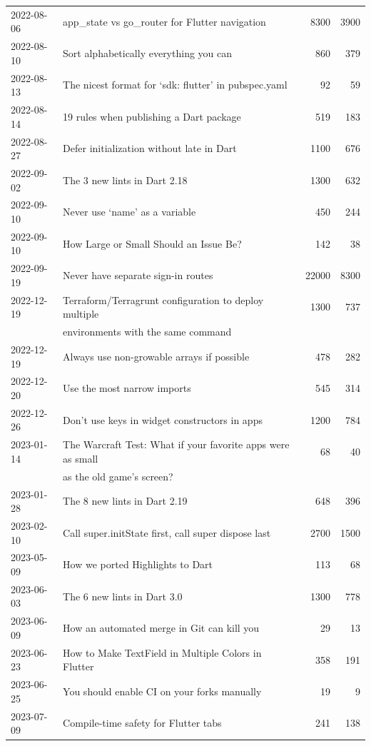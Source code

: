 \begin{longtable}{|l|l|r|r|}
    2022-08-06 & app\_state vs go\_router for Flutter navigation & 8300 & 3900\\
    2022-08-10 & Sort alphabetically everything you can & 860 & 379\\
    2022-08-13 & The nicest format for `sdk: flutter' in pubspec.yaml & 92 & 59\\
    2022-08-14 & 19 rules when publishing a Dart package & 519 & 183\\
    2022-08-27 & Defer initialization without late in Dart & 1100 & 676\\
    2022-09-02 & The 3 new lints in Dart 2.18 & 1300 & 632\\
    2022-09-10 & Never use `name' as a variable & 450 & 244\\
    2022-09-10 & How Large or Small Should an Issue Be? & 142 & 38\\
    2022-09-19 & Never have separate sign-in routes & 22000 & 8300\\
    2022-12-19 & Terraform/Terragrunt configuration to deploy multiple & 1300 & 737\\
    & environments with the same command & & \\
    2022-12-19 & Always use non-growable arrays if possible & 478 & 282\\
    2022-12-20 & Use the most narrow imports & 545 & 314\\
    2022-12-26 & Don't use keys in widget constructors in apps & 1200 & 784\\
    2023-01-14 & The Warcraft Test: What if your favorite apps were as small & 68 & 40\\
    & as the old game's screen? & & \\
    2023-01-28 & The 8 new lints in Dart 2.19 & 648 & 396\\
    2023-02-10 & Call super.initState first, call super dispose last & 2700 & 1500\\
    2023-05-09 & How we ported Highlights to Dart & 113 & 68\\
    2023-06-03 & The 6 new lints in Dart 3.0 & 1300 & 778\\
    2023-06-09 & How an automated merge in Git can kill you & 29 & 13\\
    2023-06-23 & How to Make TextField in Multiple Colors in Flutter & 358 & 191\\
    2023-06-25 & You should enable CI on your forks manually & 19 & 9\\
    2023-07-09 & Compile-time safety for Flutter tabs & 241 & 138\\

\end{longtable}
